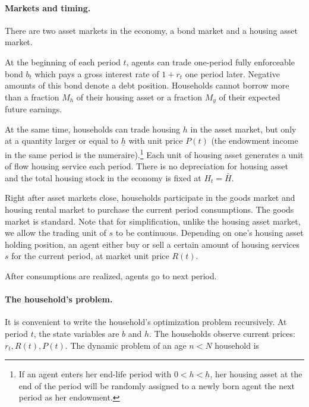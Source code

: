\documentclass[a4paper,10pt]{article}
\begin{document}
\paragraph{Markets and timing.} There are two asset markets in the economy, a bond market and a housing asset market. 

At the beginning of each period $t$, agents can trade one-period fully enforceable bond $b_t$ which pays a gross interest rate of $1+r_t$ one period later. Negative amounts of this bond denote a debt position. Households cannot borrow more than a fraction $M_h$ of their housing asset or a fraction $M_y$ of their expected future earnings.

At the same time, households can trade housing $h$ in the asset market, but only at a quantity larger or equal to $\underline{h}$ with unit price $P(t)$ (the endowment income in the same period is the numeraire).\footnote{If an agent enters her end-life period with $0<h<\underbar{h}$, her housing asset at the end of the period will be randomly assigned to a newly born agent the next period as her endowment.} Each unit of housing asset generates a unit of flow housing service each period. There is no depreciation for housing asset and the total housing stock in the economy is fixed at $H_t=\bar{H}$.

Right after asset markets close, households participate in the goods market and housing rental market to purchase the current period consumptions. The goods market is standard. Note that for simplification, unlike the housing asset market, we allow the trading unit of $s$ to be continuous. Depending on one's housing asset holding position, an agent either buy or sell a certain amount of housing services $s$ for the current period, at market unit price $R(t)$.

After consumptions are realized, agents go to next period.

\paragraph{The household's problem.}
It is convenient to write the household's optimization problem recursively. At period $t$, the state variables are $b$ and $h$. The households observe current prices: $r_t, R(t), P(t)$. The dynamic problem of an age $n<N$ household is

\end{document}
